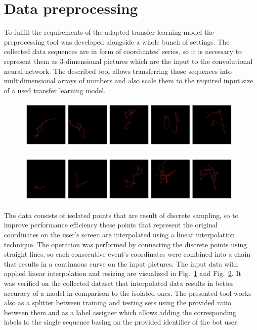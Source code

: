 \section{Data preprocessing}\label{sec:data-preprocessing}
To fulfill the requirements of the adapted transfer learning model the preprocessing tool was developed alongside a whole bunch of settings.
The collected data sequences are in form of coordinates' series, so it is necessary to represent them as 3-dimensional pictures which are the input to the convolutional neural network.
The described tool allows transferring those sequences into multidimensional arrays of numbers and also scale them to the required input size of a used transfer learning model.

\begin{figure}[!hbt]
    \center
    \includegraphics[width=\linewidth]{resources/bot_sequences}
    \label{fig:bot_sequences}
\end{figure}
\begin{figure}[!hbt]
    \center
    \includegraphics[width=\linewidth]{resources/user_sequences}
    \label{fig:user_sequences}
\end{figure}


The data consists of isolated points that are result of discrete sampling, so to improve performance efficiency these points that represent the original coordinates on the user's screen are interpolated using a linear interpolation technique.
The operation was performed by connecting the discrete points using straight lines, so each consecutive event's coordinates were combined into a chain that results in a continuous curve on the input pictures.
The input data with applied linear interpolation and resizing are visualized in Fig.~\ref{fig:bot_sequences} and Fig.~\ref{fig:user_sequences}.
It was verified on the collected dataset that interpolated data results in better accuracy of a model in comparison to the isolated ones.
The presented tool works also as a splitter between training and testing sets using the provided ratio between them and as a label assigner which allows adding the corresponding labels to the single sequence basing on the provided identifier of the bot user.

